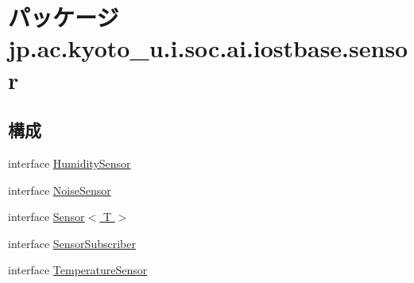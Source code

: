 \hypertarget{namespacejp_1_1ac_1_1kyoto__u_1_1i_1_1soc_1_1ai_1_1iostbase_1_1sensor}{\section{パッケージ jp.\-ac.\-kyoto\-\_\-u.\-i.\-soc.\-ai.\-iostbase.\-sensor}
\label{namespacejp_1_1ac_1_1kyoto__u_1_1i_1_1soc_1_1ai_1_1iostbase_1_1sensor}
}
\subsection*{構成}
\begin{DoxyCompactItemize}
\item 
interface \hyperlink{interfacejp_1_1ac_1_1kyoto__u_1_1i_1_1soc_1_1ai_1_1iostbase_1_1sensor_1_1_humidity_sensor}{Humidity\-Sensor}
\item 
interface \hyperlink{interfacejp_1_1ac_1_1kyoto__u_1_1i_1_1soc_1_1ai_1_1iostbase_1_1sensor_1_1_noise_sensor}{Noise\-Sensor}
\item 
interface \hyperlink{interfacejp_1_1ac_1_1kyoto__u_1_1i_1_1soc_1_1ai_1_1iostbase_1_1sensor_1_1_sensor_3_01_t_01_4}{Sensor$<$ T $>$}
\item 
interface \hyperlink{interfacejp_1_1ac_1_1kyoto__u_1_1i_1_1soc_1_1ai_1_1iostbase_1_1sensor_1_1_sensor_subscriber}{Sensor\-Subscriber}
\item 
interface \hyperlink{interfacejp_1_1ac_1_1kyoto__u_1_1i_1_1soc_1_1ai_1_1iostbase_1_1sensor_1_1_temperature_sensor}{Temperature\-Sensor}
\end{DoxyCompactItemize}
